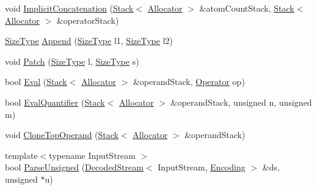 \begin{DoxyCompactItemize}
\item 
void \mbox{\hyperlink{classrapidjson_1_1internal_1_1_generic_regex_a2ba7ce518765d9751cafabaaba25bc42}{Implicit\+Concatenation}} (\mbox{\hyperlink{classrapidjson_1_1internal_1_1_stack}{Stack}}$<$ \mbox{\hyperlink{classrapidjson_1_1_allocator}{Allocator}} $>$ \&atom\+Count\+Stack, \mbox{\hyperlink{classrapidjson_1_1internal_1_1_stack}{Stack}}$<$ \mbox{\hyperlink{classrapidjson_1_1_allocator}{Allocator}} $>$ \&operator\+Stack)
\item 
\mbox{\hyperlink{namespacerapidjson_a44eb33eaa523e36d466b1ced64b85c84}{Size\+Type}} \mbox{\hyperlink{classrapidjson_1_1internal_1_1_generic_regex_aea37ce79d98a28f203ff45df21b31c2d}{Append}} (\mbox{\hyperlink{namespacerapidjson_a44eb33eaa523e36d466b1ced64b85c84}{Size\+Type}} l1, \mbox{\hyperlink{namespacerapidjson_a44eb33eaa523e36d466b1ced64b85c84}{Size\+Type}} l2)
\item 
void \mbox{\hyperlink{classrapidjson_1_1internal_1_1_generic_regex_ac06f55ca457e6f3906bb309627727e50}{Patch}} (\mbox{\hyperlink{namespacerapidjson_a44eb33eaa523e36d466b1ced64b85c84}{Size\+Type}} l, \mbox{\hyperlink{namespacerapidjson_a44eb33eaa523e36d466b1ced64b85c84}{Size\+Type}} s)
\item 
bool \mbox{\hyperlink{classrapidjson_1_1internal_1_1_generic_regex_a482f2304ba52d6dcd8d3adac4850251d}{Eval}} (\mbox{\hyperlink{classrapidjson_1_1internal_1_1_stack}{Stack}}$<$ \mbox{\hyperlink{classrapidjson_1_1_allocator}{Allocator}} $>$ \&operand\+Stack, \mbox{\hyperlink{classrapidjson_1_1internal_1_1_generic_regex_a512e6844d1d454b502727df432f8e7b9}{Operator}} op)
\item 
bool \mbox{\hyperlink{classrapidjson_1_1internal_1_1_generic_regex_acaedcdcef1a6240dc57c483a55d50fe2}{Eval\+Quantifier}} (\mbox{\hyperlink{classrapidjson_1_1internal_1_1_stack}{Stack}}$<$ \mbox{\hyperlink{classrapidjson_1_1_allocator}{Allocator}} $>$ \&operand\+Stack, unsigned n, unsigned m)
\item 
void \mbox{\hyperlink{classrapidjson_1_1internal_1_1_generic_regex_a2b7289b9bdf26768bb48f38362a75eb3}{Clone\+Top\+Operand}} (\mbox{\hyperlink{classrapidjson_1_1internal_1_1_stack}{Stack}}$<$ \mbox{\hyperlink{classrapidjson_1_1_allocator}{Allocator}} $>$ \&operand\+Stack)
\item 
{\footnotesize template$<$typename Input\+Stream $>$ }\\bool \mbox{\hyperlink{classrapidjson_1_1internal_1_1_generic_regex_add633802029c121872583a66981ae148}{Parse\+Unsigned}} (\mbox{\hyperlink{classrapidjson_1_1internal_1_1_decoded_stream}{Decoded\+Stream}}$<$ Input\+Stream, \mbox{\hyperlink{classrapidjson_1_1_encoding}{Encoding}} $>$ \&ds, unsigned $\ast$u)

\end{DoxyCompactItemize}
